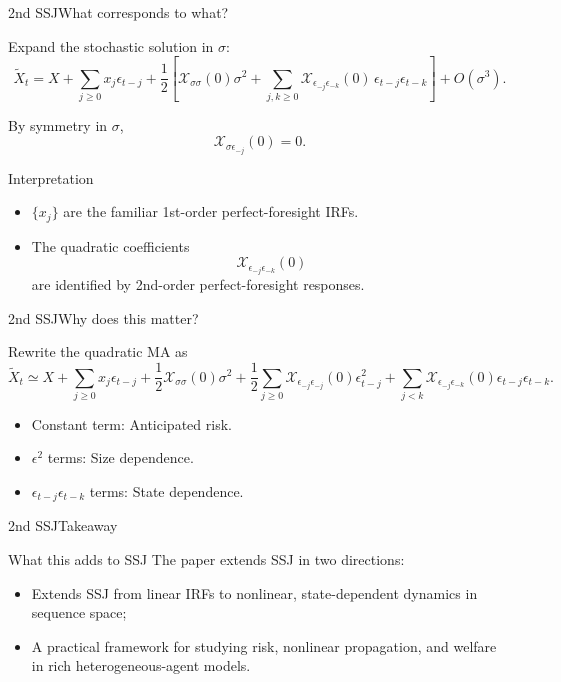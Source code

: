\documentclass[aspectratio=169]{beamer}
\begin{document}
\begin{frame}{2nd SSJ}{What corresponds to what?}
\small

Expand the stochastic solution in $\sigma$:
\[
\widetilde X_t
=
X
+\sum_{j\ge0} x_j \epsilon_{t-j}
+\frac12\!\left[
\mathcal X_{\sigma\sigma}(0)\sigma^2
+
\sum_{j,k\ge0}\mathcal X_{\epsilon_{-j}\epsilon_{-k}}(0)\,
\epsilon_{t-j}\epsilon_{t-k}
\right]
+O(\sigma^3).
\]

By symmetry in $\sigma$,
\[
\mathcal X_{\sigma\epsilon_{-j}}(0)=0.
\]

\begin{block}{Interpretation}
\begin{itemize}
    \item $\{x_j\}$ are the familiar \alert{1st-order perfect-foresight IRFs}.
    \item The quadratic coefficients
    \[
    \mathcal X_{\epsilon_{-j}\epsilon_{-k}}(0)
    \]
    are identified by \alert{2nd-order perfect-foresight responses}.
\end{itemize}
\end{block}

\end{frame}

\begin{frame}{2nd SSJ}{Why does this matter?}
\small

Rewrite the quadratic MA as
\[
\widetilde X_t \simeq
X
+\sum_{j\ge0} x_j \epsilon_{t-j}
+\frac12 \mathcal X_{\sigma\sigma}(0)\sigma^2
+\frac12\sum_{j\ge0}\mathcal X_{\epsilon_{-j}\epsilon_{-j}}(0)\epsilon_{t-j}^2
+\sum_{j<k}\mathcal X_{\epsilon_{-j}\epsilon_{-k}}(0)\epsilon_{t-j}\epsilon_{t-k}.
\]

\begin{itemize}
    \item Constant term:
    \alert{Anticipated risk}.
    \item $\epsilon^2$ terms:
    \alert{Size dependence}.
    \item $\epsilon_{t-j}\epsilon_{t-k}$ terms:
    \alert{State dependence}.
\end{itemize}

\end{frame}

\begin{frame}{2nd SSJ}{Takeaway \cite{auclert2025beyond}}
\small
\begin{alertblock}{What this adds to SSJ}
The paper extends SSJ in two directions:
\begin{itemize}
    \item Extends SSJ from linear IRFs to \alert{nonlinear, state-dependent} dynamics in sequence space;
    \item A practical framework for studying risk, nonlinear propagation, and welfare in rich heterogeneous-agent models.
\end{itemize}
\end{alertblock}
\end{frame}
\end{document}
